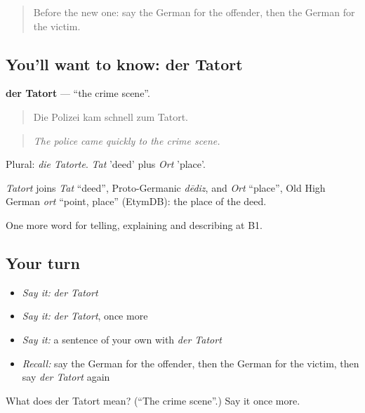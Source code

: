 \label{lesson:GE-C280-tatort}



\begin{quote}
Before the new one: say the German for the offender, then the German for the victim.
\end{quote}

\subsection*{You'll want to know: der Tatort}
\textbf{der Tatort} — \textquotedblleft{}the crime scene\textquotedblright{}.

\begin{quote}
Die Polizei kam schnell zum Tatort.
\end{quote}

\begin{quote}
\emph{The police came quickly to the crime scene.}
\end{quote}

Plural: \emph{die Tatorte}. \emph{Tat} 'deed' plus \emph{Ort} 'place'.

\begin{cousinweb}
\emph{Tatort} joins \emph{Tat} \textquotedblleft{}deed\textquotedblright{}, Proto-Germanic \emph{dēdiz}, and \emph{Ort} \textquotedblleft{}place\textquotedblright{}, Old High German \emph{ort} \textquotedblleft{}point, place\textquotedblright{} (EtymDB): the place of the deed.
\end{cousinweb}

\begin{grammarlens}[title={What you've built}]
One more word for telling, explaining and describing at B1.
\end{grammarlens}

\subsection*{Your turn}
\begin{itemize}
\raggedright
  \item \emph{Say it:} \emph{der Tatort}
  \item \emph{Say it:} \emph{der Tatort}, once more
  \item \emph{Say it:} a sentence of your own with \emph{der Tatort}
  \item \emph{Recall:} say the German for the offender, then the German for the victim, then say \emph{der Tatort} again
\end{itemize}

\begin{tcolorbox}[breakable,colback=teal!4,colframe=teal!35!black,title={Before you move on}]
What does der Tatort mean? (\textquotedblleft{}The crime scene\textquotedblright{}.) Say it once more.
\end{tcolorbox}
